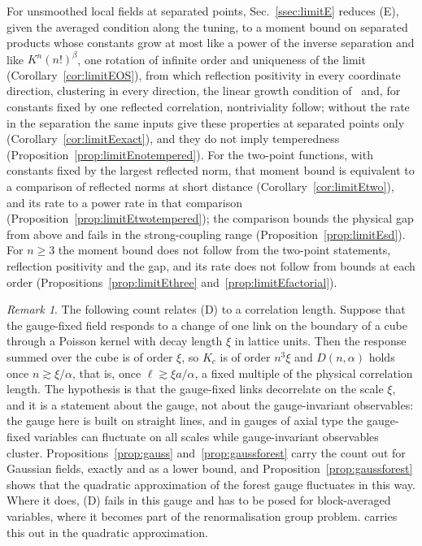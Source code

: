 \documentclass[aps,prd,twocolumn,superscriptaddress,nofootinbib,longbibliography,floatfix,amsmath,amssymb,10pt]{revtex4-2}
\theoremstyle{definition}
\theoremstyle{remark}
\newtheorem{remark}[theorem]{Remark}
\begin{document}
For unsmoothed local fields at separated points, Sec.~\ref{ssec:limitE}
reduces (E), given the averaged condition along the tuning, to a moment
bound on separated products whose constants grow at most like a power of the
inverse separation and like $K^n(n!)^\beta$, one rotation of infinite order
and uniqueness of the limit (Corollary~\ref{cor:limitEOS}), from which
reflection positivity in every coordinate direction, clustering in every
direction, the linear growth condition of~\cite{OS75} and, for constants
fixed by one reflected correlation, nontriviality follow; without the rate
in the separation the same inputs give these properties at separated points
only (Corollary~\ref{cor:limitEexact}), and they do not imply temperedness
(Proposition~\ref{prop:limitEnotempered}). For the two-point functions, with
constants fixed by the largest reflected norm, that moment bound is
equivalent to a comparison of reflected norms at short distance
(Corollary~\ref{cor:limitEtwo}), and its rate to a power rate in that
comparison (Proposition~\ref{prop:limitEtwotempered}); the comparison bounds
the physical gap from above and fails in the strong-coupling range
(Proposition~\ref{prop:limitEsd}). For $n\ge3$ the moment bound does not
follow from the two-point statements, reflection positivity and the gap, and
its rate does not follow from bounds at each order
(Propositions~\ref{prop:limitEthree} and~\ref{prop:limitEfactorial}).

\begin{remark}\label{rem:cubeheuristic}
The following count relates (D) to a correlation length. Suppose that the
gauge-fixed field responds to a change of one link on the boundary of a cube
through a Poisson kernel with decay length $\xi$ in lattice units. Then the
response summed over the cube is of order $\xi$, so $K_c$ is of order
$n^3\xi$ and $D(n,\alpha)$ holds once $n\gtrsim\xi/\alpha$, that is, once
$\ell\gtrsim\xi a/\alpha$, a fixed multiple of the physical correlation
length. The hypothesis is that the gauge-fixed links decorrelate on the
scale $\xi$, and it is a statement about the gauge, not about the
gauge-invariant observables: the gauge here is built on straight lines, and
in gauges of axial type the gauge-fixed variables can fluctuate on all
scales while gauge-invariant observables cluster. Propositions~\ref{prop:gauss}
and~\ref{prop:gaussforest} carry the count out for Gaussian fields, exactly and as a lower bound,
and Proposition~\ref{prop:gaussforest} shows that the quadratic
approximation of the forest gauge fluctuates in this way. Where it does,
(D) fails in this gauge and has to be posed for block-averaged variables,
where it becomes part of the renormalisation group problem.
\cite[Sec.~XII\,A]{BBLR26} carries this out in the quadratic approximation.
\end{remark}
\end{document}
